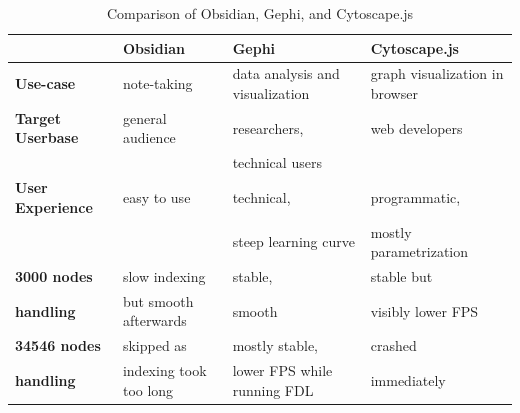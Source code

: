 \begin{table}[ht]
  \centering
  \caption{Comparison of Obsidian, Gephi, and Cytoscape.js}
  \label{tab:comparison}
  \begin{tabularx}{\textwidth}{|l|X|X|X|}
    \hline
    \textbf{}                     & \textbf{Obsidian}       & \textbf{Gephi}                      & \textbf{Cytoscape.js} \\ \hline
    \textbf{Use-case}             & note-taking             & data analysis and visualization     & graph visualization in browser \\ \hline
    \textbf{Target Userbase}      & general audience        & researchers,                        & web developers  \\ 
                                  &                         & technical users                     & \\ \hline
    \textbf{User Experience}      & easy to use             & technical,                          & programmatic, \\ 
                                  &                         & steep learning curve                & mostly parametrization\\ \hline
    \textbf{3000 nodes}           & slow indexing           & stable,                             & stable but  \\ 
    \textbf{handling}             & but smooth afterwards   & smooth                              & visibly lower FPS\\ \hline
    \textbf{34546 nodes}          & skipped as              & mostly stable,                      & crashed \\
    \textbf{handling}             & indexing took too long  & lower FPS while running FDL         & immediately\\ \hline
  \end{tabularx}
\end{table}